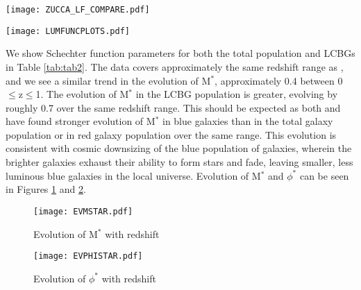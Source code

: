 \documentclass[manuscript]{aastex61}
\begin{document}
\begin{center}
\begin{figure*}
\texttt{[image: ZUCCA\_LF\_COMPARE.pdf]}
\caption{Comparing our results with those from \citet{2009A&A...508.1217Z}. Our 1/V$_{max}$ results are plotted along with the Schechter function that best fits our data (blue). We've also plotted the Schechter function calculated  by \citet{2009A&A...508.1217Z} using the STY method (black) }
\label{fig:ZUCCALUMFUNC}
\end{figure*}
\end{center}


\begin{center}
\begin{figure*}
\texttt{[image: LUMFUNCPLOTS.pdf]}
\caption{Luminosity function for the entire galaxy population (green) and LCBGs (blue). Points marked with an x are not considered in our fit. They are most often regions of M$_{B}$-z space that are not sampled well enough to give a proper estimate of $\Phi$ in that bin. The histogram below each plot shows the log$_{10}$ of the number of objects in each bin, with the white bars being total galaxies, and the gray bars being LCBGs. The number in each bin is listed above each bar. }
\label{fig:LCBGLUMFUNC}
\end{figure*}
\end{center}
We show Schechter function parameters for both the total population and LCBGs in Table \ref{tab:tab2}. The data covers approximately the same redshift range as \citet{2009A&A...508.1217Z}, and we see a similar trend in the evolution of M$^{*}$, approximately 0.4 between 0$\leq$z$\leq$1. The evolution of M$^{*}$ in the LCBG population is greater, evolving by roughly 0.7 over the same redshift range. This should be expected as both \citet{2006ApJ...647..853W} and \citet{2015ApJ...815...94B} have found stronger evolution of M$^{*}$ in blue galaxies than in the total galaxy population or in red galaxy population over the same range. This evolution is consistent with cosmic downsizing \citep{1996AJ....112..839C} of the blue population of galaxies, wherein the brighter galaxies exhaust their ability to form stars and fade, leaving smaller, less luminous blue galaxies in the local universe.
Evolution of M$^{*}$ and $\phi^{*}$ can be seen in Figures \ref{fig:EVMSTAR} and \ref{fig:EVPHISTAR}. 
\begin{center}
\begin{figure}
\texttt{[image: EVMSTAR.pdf]}
\caption{Evolution of M$^{*}$ with redshift}
\label{fig:EVMSTAR}
\end{figure}
\end{center}
\begin{center}
\begin{figure}
\texttt{[image: EVPHISTAR.pdf]}
\caption{Evolution of $\phi^{*}$ with redshift}
\label{fig:EVPHISTAR}
\end{figure}
\end{center}
\end{document}
